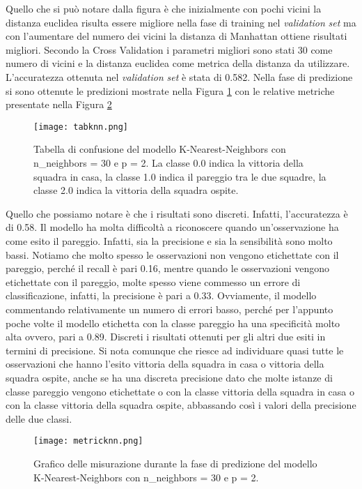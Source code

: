 Quello che si può notare dalla figura è che inizialmente con pochi vicini la distanza euclidea risulta essere migliore nella fase di training nel \emph{validation} \emph{set} ma con l'aumentare del numero dei vicini la distanza di Manhattan ottiene risultati migliori. Secondo la Cross Validation i parametri migliori sono stati 30 come numero di vicini e la distanza euclidea come metrica della distanza da utilizzare. L'accuratezza ottenuta nel \emph{validation} \emph{set} è stata di 0.582.
Nella fase di predizione si sono ottenute le predizioni mostrate nella Figura \ref{fig:knnpre} con le relative metriche presentate nella Figura \ref{fig:knnmetrics}

\begin{figure}[h]
	\begin{center}
		\texttt{[image: tabknn.png]}
		\caption{Tabella di confusione del modello K-Nearest-Neighbors con n\_neighbors = 30 e p = 2. La classe 0.0 indica la vittoria della squadra in casa, la classe 1.0 indica il pareggio tra le due squadre, la classe 2.0 indica la vittoria della squadra ospite.
		} 
		\label{fig:knnpre}
	\end{center}
\end{figure}

Quello che possiamo notare è che i risultati sono discreti. Infatti, l'accuratezza è di 0.58. Il modello ha molta difficoltà a riconoscere quando un’osservazione ha come esito il pareggio. Infatti, sia la precisione e sia la sensibilità sono molto bassi. Notiamo che molto spesso le osservazioni non vengono etichettate con il pareggio, perché il recall è pari 0.16, mentre quando le osservazioni vengono etichettate con il pareggio, molte spesso viene commesso un errore di classificazione, infatti, la precisione è pari a 0.33. Ovviamente, il modello commentando relativamente un numero di errori basso, perché per l'appunto poche volte il modello etichetta con la classe pareggio ha una specificità molto alta ovvero, pari a 0.89. Discreti i risultati ottenuti per gli altri due esiti in termini di precisione. Si nota comunque che riesce ad individuare quasi tutte le osservazioni che hanno l'esito vittoria della squadra in casa o vittoria della squadra ospite, anche se ha una discreta precisione dato che molte istanze di classe pareggio vengono etichettate o con la classe vittoria della squadra in casa o con la classe vittoria della squadra ospite, abbassando così i valori della precisione delle due classi.
\begin{figure}[h]
	\begin{center}
		\texttt{[image: metricknn.png]}
		\caption{Grafico delle misurazione durante la fase di predizione del modello K-Nearest-Neighbors con n\_neighbors = 30 e p = 2.
		} 
		\label{fig:knnmetrics}
	\end{center}
\end{figure}

